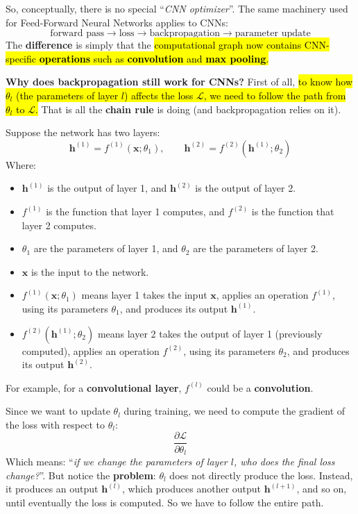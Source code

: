 \highspace
So, conceptually, there is no special ``\emph{CNN optimizer}''. The same machinery used for Feed-Forward Neural Networks applies to CNNs:
\begin{equation*}
    \text{forward pass} \to \text{loss} \to \text{backpropagation} \to \text{parameter update}
\end{equation*}
The \textbf{difference} is simply that the \hl{computational graph now contains CNN-specific \textbf{operations} such as \textbf{convolution} and \textbf{max pooling}.}

\highspace
\textcolor{Green3}{ \textbf{Why does backpropagation still work for CNNs?}} First of all, \hl{to know how $\theta_{l}$ (the parameters of layer $l$) affects the loss $\mathcal{L}$, we need to follow the path from $\theta_{l}$ to $\mathcal{L}$.} That is all the \textbf{chain rule} is doing (and backpropagation relies on it).

\highspace
Suppose the network has two layers:
\begin{equation*}
    \mathbf{h}^{(1)}
    =
    f^{(1)}(\mathbf x;\theta_1),
    \qquad
    \mathbf{h}^{(2)}
    =
    f^{(2)}(\mathbf{h}^{(1)};\theta_2)
\end{equation*}
Where:
\begin{itemize}
    \item $\mathbf{h}^{(1)}$ is the output of layer 1, and $\mathbf{h}^{(2)}$ is the output of layer 2.
    \item $f^{(1)}$ is the function that layer 1 computes, and $f^{(2)}$ is the function that layer 2 computes.
    \item $\theta_1$ are the parameters of layer 1, and $\theta_2$ are the parameters of layer 2.
    \item $\mathbf{x}$ is the input to the network.
    \item $f^{(1)}(\mathbf x;\theta_1)$ means layer 1 takes the input $\mathbf{x}$, applies an operation $f^{(1)}$, using its parameters $\theta_1$, and produces its output $\mathbf{h}^{(1)}$.
    \item $f^{(2)}(\mathbf{h}^{(1)};\theta_2)$ means layer 2 takes the output of layer 1 (previously computed), applies an operation $f^{(2)}$, using its parameters $\theta_2$, and produces its output $\mathbf{h}^{(2)}$.
\end{itemize}
For example, for a \textbf{convolutional layer}, $f^{(l)}$ could be a \textbf{convolution}.

\highspace
Since we want to update $\theta_{l}$ during training, we need to compute the gradient of the loss with respect to $\theta_{l}$:
\begin{equation*}
    \frac{\partial\mathcal{L}}{\partial\theta_l}
\end{equation*}
Which means: ``\emph{if we change the parameters of layer $l$, who does the final loss change?}''. But notice the \textbf{problem}: $\theta_{l}$ does not directly produce the loss. Instead, it produces an output $\mathbf{h}^{(l)}$, which produces another output $\mathbf{h}^{(l+1)}$, and so on, until eventually the loss is computed. So we have to follow the entire path.

